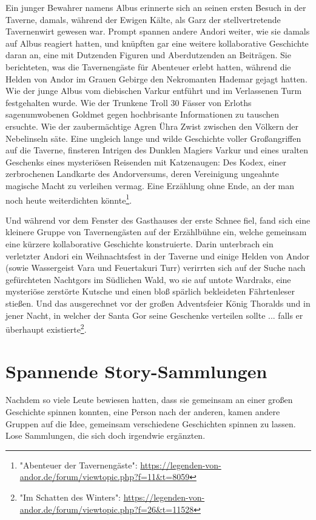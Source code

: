 Ein junger Bewahrer namens Albus erinnerte sich an seinen ersten Besuch in der Taverne, damals, während der Ewigen Kälte, als Garz der stellvertretende Tavernenwirt gewesen war. Prompt spannen andere Andori weiter, wie sie damals auf Albus reagiert hatten, und knüpften gar eine weitere kollaborative Geschichte daran an, eine mit Dutzenden Figuren und Aberdutzenden an Beiträgen. Sie berichteten, was die Tavernengäste für Abenteuer erlebt hatten, während die Helden von Andor im Grauen Gebirge den Nekromanten Hademar gejagt hatten. Wie der junge Albus vom diebischen Varkur entführt und im Verlassenen Turm festgehalten wurde. Wie der Trunkene Troll 30 Fässer von Erloths sagenumwobenen Goldmet gegen hochbrisante Informationen zu tauschen ersuchte. Wie der zaubermächtige Agren Ühra Zwist zwischen den Völkern der Nebelinseln säte. Eine ungleich lange und wilde Geschichte voller Großangriffen auf die Taverne, finsteren Intrigen des Dunklen Magiers Varkur und eines uralten Geschenks eines mysteriösen Reisenden mit Katzenaugen: Des Kodex, einer zerbrochenen Landkarte des Andorversums, deren Vereinigung ungeahnte magische Macht zu verleihen vermag. Eine Erzählung ohne Ende, an der man noch heute weiterdichten könnte\footnote{"Abenteuer der Tavernengäste": \url{https://legenden-von-andor.de/forum/viewtopic.php?f=11&t=8059}}.

Und während vor dem Fenster des Gasthauses der erste Schnee fiel, fand sich eine kleinere Gruppe von Tavernengästen auf der Erzählbühne ein, welche gemeinsam eine kürzere kollaborative Geschichte konstruierte. Darin unterbrach ein verletzter Andori ein Weihnachtsfest in der Taverne und einige Helden von Andor (sowie Wassergeist Vara und Feuertakuri Turr) verirrten sich auf der Suche nach gefürchteten Nachtgors im Südlichen Wald, wo sie auf untote Wardraks, eine mysteriöse zerstörte Kutsche und einen bloß spärlich bekleideten Fährtenleser stießen. Und das ausgerechnet vor der großen Adventsfeier König Thoralds und in jener Nacht, in welcher der Santa Gor seine Geschenke verteilen sollte ... falls er überhaupt existierte\footnote{"Im Schatten des Winters": \url{https://legenden-von-andor.de/forum/viewtopic.php?f=26&t=11528}}.

\newpage
\section{Spannende Story-Sammlungen}

Nachdem so viele Leute bewiesen hatten, dass sie gemeinsam an einer großen Geschichte spinnen konnten, eine Person nach der anderen, kamen andere Gruppen auf die Idee, gemeinsam verschiedene Geschichten spinnen zu lassen. Lose Sammlungen, die sich doch irgendwie ergänzten.


